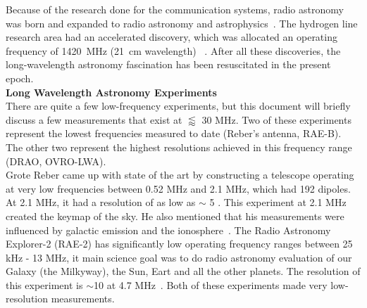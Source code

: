 	    Because of the research done for the communication systems, radio astronomy was born and expanded to radio astronomy and astrophysics~\citep{2012PASP..124.1090H}. The hydrogen line research area had an accelerated discovery, which was allocated an operating frequency of \SI{1420}{MHz} (\SI{21}{cm} wavelength) ~\citep{10.2307/530765}. After all these discoveries, the long-wavelength astronomy fascination has been resuscitated in the present epoch.\\
	    
	    {\bf{Long Wavelength Astronomy Experiments}}\\
	    
	    There are quite a few low-frequency experiments, but this document will briefly discuss a few measurements that exist at $\lessapprox$ 30 MHz. Two of these experiments represent the lowest frequencies measured to date (Reber's antenna, RAE-B). The other two represent the highest resolutions achieved in this frequency range (DRAO, OVRO-LWA).\\
	    
	    Grote Reber came up with state of the art by constructing a telescope operating at very low frequencies between 0.52 MHz and 2.1 MHz, which had 192 dipoles. At 2.1 MHz, it had a resolution of as low as $\sim$ 5 \degree. This experiment at 2.1 MHz created the keymap of the sky. He also mentioned that his measurements were influenced by galactic emission and the ionosphere~\citep{article, 1988A&A...195..372W}. The Radio Astronomy Explorer-2 (RAE-2) has significantly low operating frequency ranges between 25 kHz - 13 MHz, it main science goal was to do radio astronomy evaluation of our Galaxy (the Milkyway), the Sun, Eart and all the other planets. The resolution of this experiment is $\sim$10 \degree at 4.7 MHz~\citep{1975A&A....40..365A}. Both of these experiments made very low-resolution measurements.\\
	    
